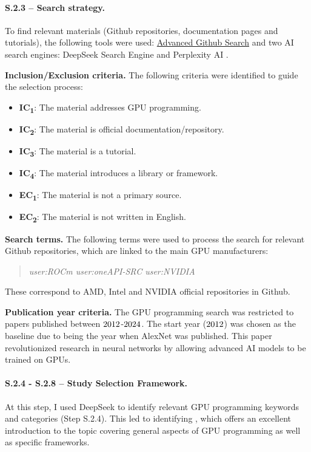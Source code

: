 \paragraph{S.2.3 -- Search strategy.}
To find relevant materials (Github repositories, documentation pages and tutorials), the following
tools were used: \href{https://github.com/search/advanced}{Advanced Github Search} and two AI
search engines: DeepSeek Search Engine \cite{noauthor_deepseek_nodate} and Perplexity AI
\cite{noauthor_perplexity_nodate}.

\textbf{Inclusion/Exclusion criteria.}
The following criteria were identified to guide the selection process:

\begin{itemize}
	\item \textbf{IC\textsubscript{1}}: The material addresses GPU programming.
	\item \textbf{IC\textsubscript{2}}: The material is official documentation/repository.
	\item \textbf{IC\textsubscript{3}}: The material is a tutorial.
	\item \textbf{IC\textsubscript{4}}: The material introduces a library or framework. \\
	\item \textbf{EC\textsubscript{1}}: The material is not a primary source.
	\item \textbf{EC\textsubscript{2}}: The material is not written in English.
\end{itemize}

\textbf{Search terms.}
The following terms were used to process the search for relevant Github repositories, which are
linked to the main GPU manufacturers:

\begin{quote}
	\textit{user:ROCm user:oneAPI-SRC user:NVIDIA}
\end{quote}

These correspond to AMD, Intel and NVIDIA official repositories in Github.

\textbf{Publication year criteria.}
The GPU programming search was restricted to papers published between
$2012$-$2024$. The start year ($2012$) was chosen as the baseline due
to being the year when AlexNet \cite{krizhevsky_imagenet_2012} was published. This paper
revolutionized research in neural networks by allowing advanced AI models to be trained on GPUs.

\paragraph{S.2.4 - S.2.8 -- Study Selection Framework.}
\label{sec:ai-screening}
At this step, I used DeepSeek \cite{noauthor_deepseek_nodate} to identify relevant GPU programming
keywords and categories (Step S.2.4). This led to identifying \cite{noauthor_enccsgpu-programming_nodate}, which
offers an excellent introduction to the topic covering general aspects of GPU programming as well
as specific frameworks.

